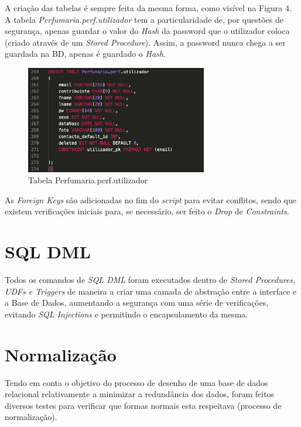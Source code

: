 \documentclass[10pt,portuguese]{article}
\begin{document}
\par A criação das tabelas é sempre feita da mesma forma, como visível na Figura 4. A tabela \textit{Perfumaria.perf.utilizador} tem a particularidade de, por questões de segurança, apenas guardar o valor do \textit{Hash} da password que o utilizador coloca (criado através de um \textit{Stored Procedure}). Assim, a password nunca chega a ser guardada na BD, apenas é guardado o \textit{Hash}. 

\begin{figure}[!h]
    \centering
    \includegraphics[width=300]{images/utilizador.png}
    \caption{Tabela Perfumaria.perf.utilizador}
\end{figure}

\par As \textit{Foreign Keys} são adicionadas no fim do \textit{script} para evitar conflitos, sendo que existem verificações iniciais para, se necessário, ser feito o \textit{Drop} de \textit{Constraints}.

\clearpage

\section{SQL DML}

\par Todos os comandos de \textit{SQL DML} foram executados dentro de \textit{Stored Procedures, UDFs e Triggers} de maneira a criar uma camada de abstração entre a interface e a Base de Dados, aumentando a segurança com uma série de verificações, evitando \textit{SQL Injections} e permitindo o encapsulamento da mesma.

\section{Normalização}
\par Tendo em conta o objetivo do processo de desenho de uma base de dados relacional relativamente a minimizar a redundância dos dados, foram feitos diversos testes para verificar que formas normais esta respeitava (processo de normalização).
\end{document}
